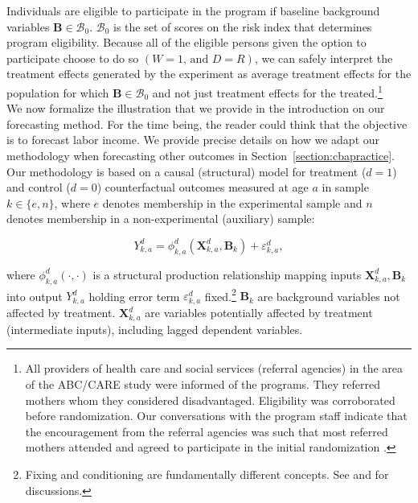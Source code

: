 \noindent Individuals are eligible to participate in the program if baseline background variables $\bm{B}\in\mathcal{B}_0$. $\mathcal{B}_0$ is the set of scores on the risk index that determines program eligibility. Because all of the eligible persons given the option to participate choose to do so $(W=1\text{, and } D=R)$, we can safely interpret the treatment effects generated by the experiment as average treatment effects for the population for which $\bm{B}\in\mathcal{B}_0$ and not just treatment effects for the treated.\footnote{All providers of health care and social services (referral agencies) in the area of the ABC/CARE study were informed of the programs. They referred mothers whom they considered disadvantaged. Eligibility was corroborated before randomization. Our conversations with the program staff indicate that the encouragement from the referral agencies was such that most referred mothers attended and agreed to participate in the initial randomization \citep{Ramey-etal_2012-ABC}.}\\

\noindent We now formalize the illustration that we provide in the introduction on our forecasting method. For the time being, the reader could think that the objective is to forecast labor income. We provide precise details on how we adapt our methodology when forecasting other outcomes in Section~\ref{section:cbapractice}.\\

\noindent Our methodology is based on a causal (structural) model for treatment ($d=1$) and control ($d=0$) counterfactual outcomes measured at age $a$ in sample $k \in \{e,n\}$, where $e$ denotes membership in the experimental sample and $n$ denotes membership in a non-experimental (auxiliary) sample:

\begin{equation}
Y^d_{k,a} = \phi^d_{k,a} (\bm{X}^d_{k,a}, \bm{B}_k) + \varepsilon^d_{k,a}, \label{eq:outcome}
\end{equation}

\noindent where $\phi^d_{k,a}\left( \cdot, \cdot \right)$ is a structural production relationship mapping inputs $\bm{X}^d_{k,a}, \bm{B}_k$ into output $Y^d_{k,a}$ holding error term $\varepsilon^d_{k,a}$ fixed.\footnote{Fixing and conditioning are fundamentally different concepts. See \cite{Haavelmo_1943_Econometrica} and \citet{Heckman_Pinto_2015_EconometTheory} for discussions.} $ \bm{B}_k$ are background variables not affected by treatment. $\bm{X}^d_{k,a}$ are variables potentially affected by treatment (intermediate inputs), including lagged dependent variables.\\

